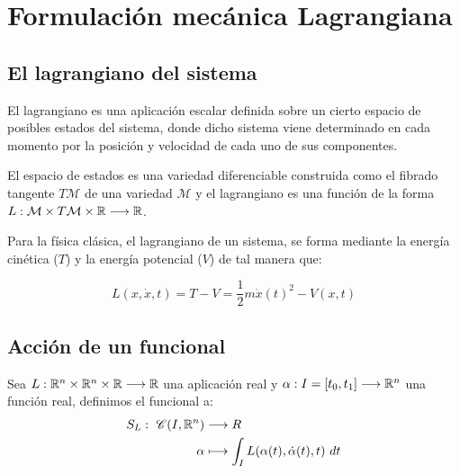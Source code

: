 \chapter{Formulación mecánica Lagrangiana}


\section{El lagrangiano del sistema}

El lagrangiano es una aplicación escalar definida sobre un cierto espacio de posibles estados del sistema, donde dicho sistema viene determinado en cada momento por la posición y velocidad de cada uno de sus componentes.

El espacio de estados es una variedad diferenciable construida como el fibrado tangente $T\mathcal{M}$ de una variedad $\mathcal{M}$ y el lagrangiano es una función de la forma $L:\mathcal{M}\times T\mathcal{M}\times\mathbb{R}\longrightarrow \mathbb{R}$.

Para la física clásica, el lagrangiano de un sistema, se forma mediante la energía cinética ($T$) y la energía potencial ($V$) de tal manera que:
\begin{postulate}
    \begin{equation}
        \label{eq:lagrangiano_clasico}
        L(x,\dot{x},t)=T-V=\frac{1}{2}m\dot{x}(t)^2-V(x,t)
    \end{equation}
\end{postulate}


\section{Acción de un funcional}
\begin{definition}
    Sea $L:\mathbb{R}^n\times\mathbb{R}^n\times\mathbb{R}\longrightarrow \mathbb{R}$ una aplicación real y $\alpha:I=[t_0, t_1]\longrightarrow \mathbb{R}^n$ una función real, definimos el funcional  a:
    \begin{equation}
        \label{eq:accion}
        \begin{split}
            S_L:\ \mathscr{C}(I, \mathbb{R}^n) & \longrightarrow R \\ \alpha & \longmapsto \int_{I}L(\alpha(t), \dot{\alpha}(t), t)\ dt
        \end{split}
    \end{equation}
\end{definition}

